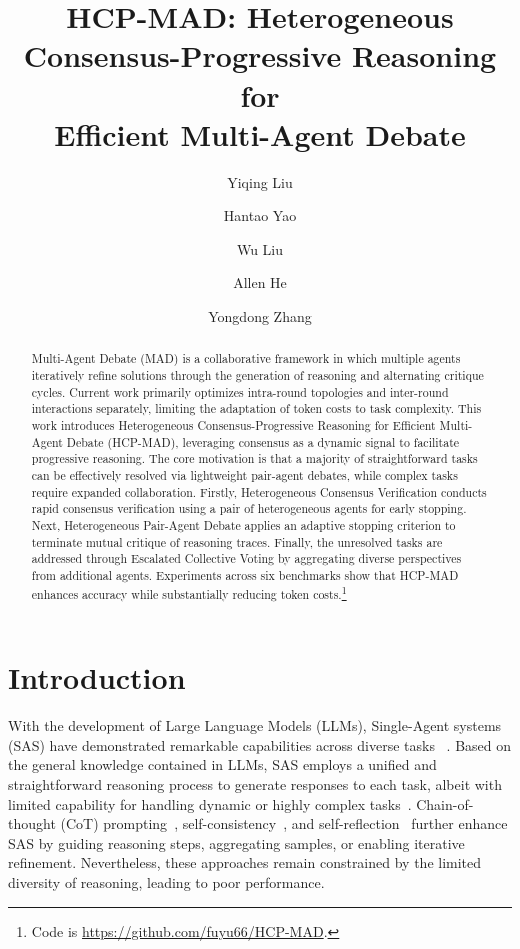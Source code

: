 \documentclass[11pt]{article}
\title{HCP-MAD: Heterogeneous Consensus-Progressive Reasoning for \\ Efficient Multi-Agent Debate}
\author[1]{Yiqing Liu}
\author[1]{Hantao Yao}
\author[1]{Wu Liu}
\author[ ]{Allen He} %
\author[1]{Yongdong Zhang}
\affil[1]{University of Science and Technology of China}
\begin{document}
\maketitle
\begin{abstract}
Multi-Agent Debate (MAD) is a collaborative framework in which multiple agents iteratively refine solutions through the generation of reasoning and alternating critique cycles.
Current work primarily optimizes intra-round topologies and inter-round interactions separately, limiting the adaptation of token costs to task complexity.
This work introduces Heterogeneous Consensus-Progressive Reasoning for Efficient Multi-Agent Debate (HCP-MAD), leveraging consensus as a dynamic signal to facilitate progressive reasoning. 
The core motivation is that a majority of straightforward tasks can be effectively resolved via lightweight pair-agent debates, while complex tasks require expanded collaboration.  
Firstly, Heterogeneous Consensus Verification conducts rapid consensus verification using a pair of heterogeneous agents for early stopping.
Next, Heterogeneous Pair-Agent Debate applies an adaptive stopping criterion to terminate mutual 
critique of reasoning traces.
Finally, the unresolved tasks are addressed through Escalated Collective Voting by aggregating diverse perspectives from additional agents.
Experiments across six benchmarks show that HCP-MAD enhances accuracy while substantially reducing token costs.\footnote{Code is \url{https://github.com/fuyu66/HCP-MAD}.}
\end{abstract}

\section{Introduction}

With the development of Large Language Models (LLMs), Single-Agent systems (SAS)  have demonstrated remarkable capabilities across diverse tasks ~\cite{kojima2022large,wan2023better,li2025fundamental}. 
Based on the general knowledge contained in LLMs, SAS employs a unified and straightforward reasoning process to generate responses to each task, albeit with limited capability for handling dynamic or highly complex tasks~\cite{mirzadeh2024gsm,jiang2024peek,guo2024large}.
Chain-of-thought (CoT) prompting~\cite{wei2022chain}, self-consistency~\cite{wangself,liescape}, and self-reflection~\cite{madaan2023self} further enhance SAS by guiding reasoning steps, aggregating samples, or enabling iterative refinement.
Nevertheless, these approaches remain constrained by the limited diversity of reasoning, leading to poor performance.
\end{document}
